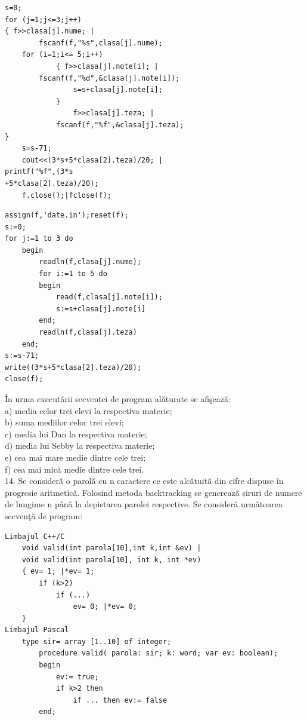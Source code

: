 \documentclass[10pt]{article}
\begin{document}
\begin{verbatim}
s=0;
for (j=1;j<=3;j++)
{ f>>clasa[j].nume; |
        fscanf(f,"%s",clasa[j].nume);
    for (i=1;i<= 5;i++)
            { f>>clasa[j].note[i]; |
        fscanf(f,"%d",&clasa[j].note[i]);
                s=s+clasa[j].note[i];
            }
                f>>clasa[j].teza; |
            fscanf(f,"%f",&clasa[j].teza);
}
    s=s-71;
    cout<<(3*s+5*clasa[2].teza)/20; |
printf("%f",(3*s
+5*clasa[2].teza)/20);
    f.close();|fclose(f);
\end{verbatim}

\begin{verbatim}
assign(f,'date.in');reset(f);
s:=0;
for j:=1 to 3 do
    begin
        readln(f,clasa[j].nume);
        for i:=1 to 5 do
        begin
            read(f,clasa[j].note[i]);
            s:=s+clasa[j].note[i]
        end;
        readln(f,clasa[j].teza)
    end;
s:=s-71;
write((3*s+5*clasa[2].teza)/20);
close(f);
\end{verbatim}

În urma executării secvenței de program alăturate se afişează:\\
a) media celor trei elevi la respectiva materie;\\
b) suma mediilor celor trei elevi;\\
c) media lui Dan la respectiva materie;\\
d) media lui Sebby la respectiva materie;\\
e) cea mai mare medie dintre cele trei;\\
f) cea mai mică medie dintre cele trei.\\
14. Se consideră o parolă cu n caractere ce este alcătuită din cifre dispuse în progresie aritmetică. Folosind metoda backtracking se generează șiruri de numere de lungime n până la depistarea parolei respective. Se consideră următoarea secvenţă de program:

\begin{verbatim}
Limbajul C++/C
    void valid(int parola[10],int k,int &ev) |
    void valid(int parola[10], int k, int *ev)
    { ev= 1; |*ev= 1;
        if (k>2)
            if (...)
                ev= 0; |*ev= 0;
    }
Limbajul Pascal
    type sir= array [1..10] of integer;
        procedure valid( parola: sir; k: word; var ev: boolean);
        begin
            ev:= true;
            if k>2 then
                if ... then ev:= false
        end;
\end{verbatim}
\end{document}
